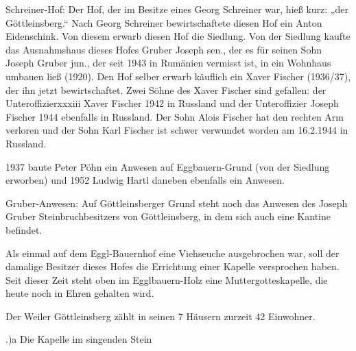 \documentclass{book}
\begin{document}
Schreiner-Hof: Der Hof, der im Besitze eines Georg Schreiner war, hieß kurz:
„der Göttleinsberg.“ Nach Georg Schreiner bewirtschaftete diesen Hof ein Anton
Eidenschink. Von diesem erwarb diesen Hof die Siedlung. Von der Siedlung kaufte
das Ausnahmshaus dieses Hofes Gruber Joseph sen., der es für seinen Sohn Joseph
Gruber jun., der seit 1943 in Rumänien vermisst ist, in ein Wohnhaus umbauen
ließ (1920). Den Hof selber erwarb käuflich ein Xaver Fischer (1936/37), der ihn
jetzt bewirtschaftet. Zwei Söhne des Xaver Fischer sind gefallen: der
Unteroffizierxxxiii Xaver Fischer 1942 in Russland und der Unteroffizier Joseph
Fischer 1944 ebenfalls in Russland. Der Sohn Alois Fischer hat den rechten Arm
verloren und der Sohn Karl Fischer ist schwer verwundet worden am 16.2.1944 in
Russland.

1937 baute Peter Pöhn ein Anwesen auf Eggbauern-Grund (von der Siedlung
erworben) und 1952 Ludwig Hartl daneben ebenfalls ein Anwesen.

Gruber-Anwesen: Auf Göttleinsberger Grund steht noch das Anwesen des Joseph
Gruber Steinbruchbesitzers von Göttleinsberg, in dem sich auch eine Kantine
befindet.

Als einmal auf dem Eggl-Bauernhof eine Viehseuche ausgebrochen war, soll der
damalige Besitzer dieses Hofes die Errichtung einer Kapelle versprochen haben.
Seit dieser Zeit steht oben im Egglbauern-Holz eine Muttergotteskapelle, die
heute noch in Ehren gehalten wird.

Der Weiler Göttleinsberg zählt in seinen 7 Häusern zurzeit 42 Einwohner.

.)a Die Kapelle im singenden Stein
\end{document}
